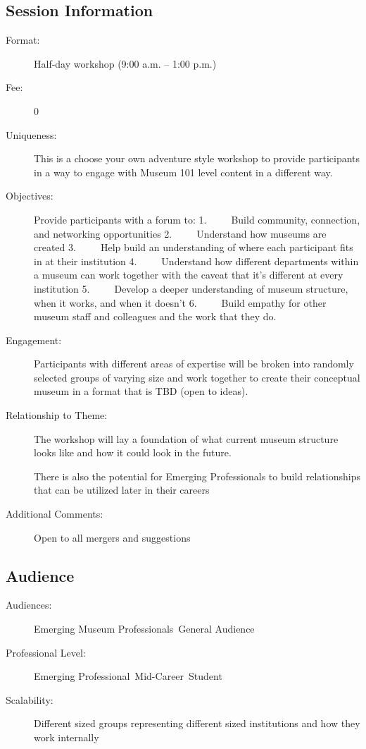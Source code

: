 \documentclass{report}
\begin{document}
              \subsection*{Session Information}
                \begin{description}
                  \item [Format:] Half-day workshop (9:00 a.m. – 1:00 p.m.)
							    
								  \item [Fee:]0
							     
							    \item [Uniqueness:]This is a choose your own adventure style workshop to provide participants in a way to engage with Museum 101 level content in a different way.
							    \item [Objectives:]Provide participants with a forum to:
1.     Build community, connection, and networking opportunities
2.     Understand how museums are created
3.     Help build an understanding of where each participant fits in at their institution 
4.     Understand how different departments within a museum can work together with the caveat that it’s different at every institution
5.     Develop a deeper understanding of museum structure, when it works, and when it doesn’t
6.     Build empathy for other museum staff and colleagues and the work that they do.
							    \item [Engagement:]Participants with different areas of expertise will be broken into randomly selected groups of varying size and work together to create their conceptual museum in a format that is TBD (open to ideas).
							    \item [Relationship to Theme:]The workshop will lay a foundation of what current museum structure looks like and how it could look in the future. 

There is also the potential for Emerging Professionals to build relationships that can be utilized later in their careers
							    
                    \item [Additional Comments: ]Open to all mergers and suggestions

                \end{description}
              \subsection*{Audience}
                \begin{description}
                  \item [Audiences:]Emerging Museum Professionals~General Audience~
                  \item[Professional Level:]Emerging Professional~Mid-Career~Student~
                \item[Scalability:] Different sized groups representing different sized institutions and how they work internally 

							
              \end{description}
\end{document}
